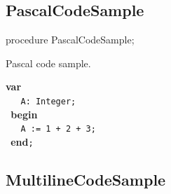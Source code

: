 \documentclass{report}
\newif\ifpdf
\begin{document}
\subsection*{PascalCodeSample}
\fi
\label{ok_helpinsight_comments-PascalCodeSample}
\begin{list}{}{
\setlength{\itemindent}{0cm}
\setlength{\listparindent}{0cm}
\setlength{\leftmargin}{\evensidemargin}
\addtolength{\leftmargin}{\tmplength}
\settowidth{\labelsep}{X}
\addtolength{\leftmargin}{\labelsep}
\setlength{\labelwidth}{\tmplength}
}
\item[\textbf{Declaration}\hfill]
\ifpdf
\begin{flushleft}
\fi
\begin{ttfamily}
procedure PascalCodeSample;\end{ttfamily}

\ifpdf
\end{flushleft}
\fi

\par
\item[\textbf{Description}]
Pascal code sample.\hfill\vspace*{1ex}

 \texttt{}\textbf{var}\texttt{\\\nopagebreak[3]
~~~A:~Integer;\\\nopagebreak[3]
~}\textbf{begin}\texttt{\\\nopagebreak[3]
~~~A~:=~1~+~2~+~3;\\\nopagebreak[3]
~}\textbf{end}\texttt{;\\
}

\end{list}
\ifpdf
\subsection*{\large{\textbf{MultilineCodeSample}}\normalsize\hspace{1ex}\hrulefill}
\else
\end{document}
